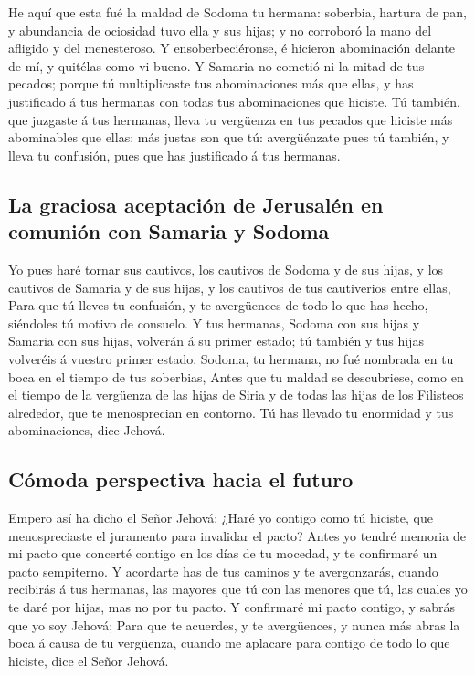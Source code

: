  He aquí que esta fué la maldad de Sodoma tu hermana:
soberbia, hartura de pan, y abundancia de ociosidad tuvo ella y sus
hijas; y no corroboró la mano del afligido y del menesteroso.
 Y ensoberbeciéronse, é hicieron abominación delante de
mí, y quitélas como vi bueno.  Y Samaria no cometió ni la
mitad de tus pecados; porque tú multiplicaste tus abominaciones más que
ellas, y has justificado á tus hermanas con todas tus abominaciones que
hiciste.  Tú también, que juzgaste á tus hermanas, lleva
tu vergüenza en tus pecados que hiciste más abominables que ellas: más
justas son que tú: avergüénzate pues tú también, y lleva tu confusión,
pues que has justificado á tus hermanas.

\hypertarget{la-graciosa-aceptaciuxf3n-de-jerusaluxe9n-en-comuniuxf3n-con-samaria-y-sodoma}{%
\subsection{La graciosa aceptación de Jerusalén en comunión con Samaria
y
Sodoma}\label{la-graciosa-aceptaciuxf3n-de-jerusaluxe9n-en-comuniuxf3n-con-samaria-y-sodoma}}

 Yo pues haré tornar sus cautivos, los cautivos de Sodoma
y de sus hijas, y los cautivos de Samaria y de sus hijas, y los cautivos
de tus cautiverios entre ellas,  Para que tú lleves tu
confusión, y te avergüences de todo lo que has hecho, siéndoles tú
motivo de consuelo.  Y tus hermanas, Sodoma con sus hijas
y Samaria con sus hijas, volverán á su primer estado; tú también y tus
hijas volveréis á vuestro primer estado.  Sodoma, tu
hermana, no fué nombrada en tu boca en el tiempo de tus soberbias,
 Antes que tu maldad se descubriese, como en el tiempo de
la vergüenza de las hijas de Siria y de todas las hijas de los Filisteos
alrededor, que te menosprecian en contorno.  Tú has
llevado tu enormidad y tus abominaciones, dice Jehová.

\hypertarget{cuxf3moda-perspectiva-hacia-el-futuro}{%
\subsection{Cómoda perspectiva hacia el
futuro}\label{cuxf3moda-perspectiva-hacia-el-futuro}}

 Empero así ha dicho el Señor Jehová: ¿Haré yo contigo
como tú hiciste, que menospreciaste el juramento para invalidar el
pacto?  Antes yo tendré memoria de mi pacto que concerté
contigo en los días de tu mocedad, y te confirmaré un pacto sempiterno.
 Y acordarte has de tus caminos y te avergonzarás, cuando
recibirás á tus hermanas, las mayores que tú con las menores que tú, las
cuales yo te daré por hijas, mas no por tu pacto.  Y
confirmaré mi pacto contigo, y sabrás que yo soy Jehová; 
Para que te acuerdes, y te avergüences, y nunca más abras la boca á
causa de tu vergüenza, cuando me aplacare para contigo de todo lo que
hiciste, dice el Señor Jehová.

